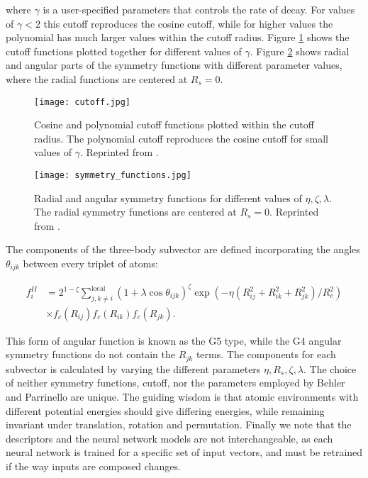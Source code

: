 where $\gamma$ is a user-specified parameters that controls the rate of decay.
For values of $\gamma < 2$ this cutoff reproduces the cosine cutoff, while for higher
values the polynomial has much larger values within the cutoff radius.
Figure \ref{fig:cutoff} shows the cutoff functions plotted together
for different values of $\gamma$.
Figure \ref{fig:symmetry-functions} shows radial and angular parts of the symmetry functions
with different parameter values, where the radial functions are centered at $R_s = 0$.

\begin{figure}[H]
    \centering
    \texttt{[image: cutoff.jpg]}
    \caption{Cosine and polynomial cutoff functions plotted within
        the cutoff radius. 
        The polynomial cutoff reproduces the cosine cutoff for small values
        of $\gamma$.
        Reprinted from \parencite[
            Khorshidi, Alireza and Peterson, Andrew A.]{khorshidi2016amp}.}
    \label{fig:cutoff}
\end{figure}

\begin{figure}[H]
    \centering
    \texttt{[image: symmetry\_functions.jpg]}
    \caption{Radial and angular symmetry functions for different values
        of $\eta, \zeta, \lambda$. The radial symmetry functions
        are centered at $R_s = 0$. Reprinted from \parencite[
            Khorshidi, Alireza and Peterson, Andrew A.]{khorshidi2016amp}.}
    \label{fig:symmetry-functions}
\end{figure}

The components of the three-body subvector are defined incorporating
the angles $\theta_{ijk}$ between every triplet of atoms:

\begin{equation}
\begin{split}
    f_i^{II} &= 2^{1 - \zeta} \sum_{j,k \neq i}^{\text{local}}
    (1 + \lambda \cos \theta_{ijk})^{\zeta}
    \exp \left( -\eta \left( R_{ij}^2 + R_{ik}^2 + R_{jk}^2
    \right) / R_c^2 \right) \\
    & \times f_c(R_{ij}) f_c(R_{ik}) f_c(R_{jk}) .
\end{split}
\end{equation}

This form of angular function is known as the G5 type, while the G4
angular symmetry functions do not contain the $R_{jk}$ terms.
The components for each subvector is calculated by varying
the different parameters $\eta, R_s, \zeta, \lambda$.
The choice of neither symmetry functions, cutoff, nor the parameters
employed by Behler and Parrinello are unique. The guiding
wisdom is that atomic environments with different
potential energies should give differing energies,
while remaining invariant under translation, rotation and permutation.
Finally we note that the descriptors and the neural network
models are not interchangeable, as each neural network
is trained for a specific set of input vectors, and must
be retrained if the way inputs are composed changes.

